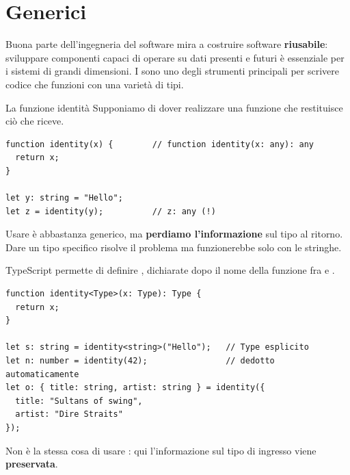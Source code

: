 \section{Generici}

Buona parte dell'ingegneria del software mira a costruire software
\textbf{riusabile}: sviluppare componenti capaci di operare su dati presenti e
futuri è essenziale per i sistemi di grandi dimensioni. I  sono
uno degli strumenti principali per scrivere codice che funzioni con una varietà
di tipi.

\begin{esempio}{La funzione identità}
Supponiamo di dover realizzare una funzione che restituisce ciò che riceve.

\begin{lstlisting}[style=ts]
function identity(x) {        // function identity(x: any): any
  return x;
}

let y: string = "Hello";
let z = identity(y);          // z: any (!)
\end{lstlisting}

Usare  è abbastanza generico, ma \textbf{perdiamo l'informazione} sul
tipo al ritorno. Dare un tipo specifico risolve il problema ma funzionerebbe
solo con le stringhe.

TypeScript permette di definire , dichiarate dopo il
nome della funzione fra \code{<} e \code{>}.

\begin{affianco}[0.55][c]
\codicepiccolo
\begin{lstlisting}[style=ts, name=generics.ts]
function identity<Type>(x: Type): Type {
  return x;
}

let s: string = identity<string>("Hello");   // Type esplicito
let n: number = identity(42);                // dedotto automaticamente
let o: { title: string, artist: string } = identity({
  title: "Sultans of swing",
  artist: "Dire Straits"
});
\end{lstlisting}
\risultato
\begin{immagine}
\end{immagine}
\end{affianco}

Non è la stessa cosa di usare : qui l'informazione sul tipo di
ingresso viene \textbf{preservata}.
\end{esempio}

